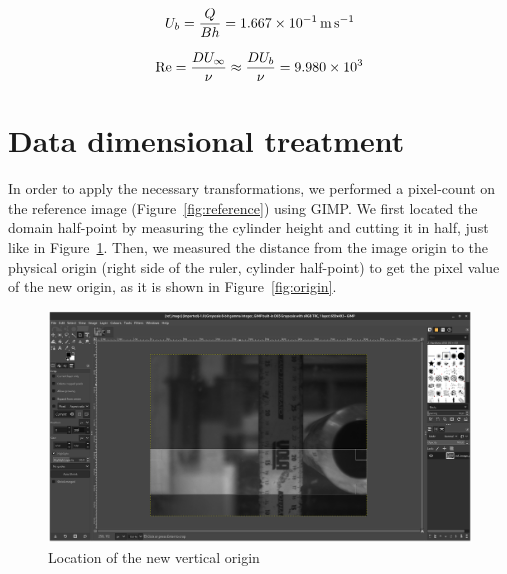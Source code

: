 \documentclass[12pt]{article}
\begin{document}
        \begin{equation} \label{eq:Ub}
                U_b = \frac{Q}{B h} = \SI{1.667E-1}{\metre \per \second}
        \end{equation}

        \begin{equation} \label{eq:Re}
                \text{Re} = \frac{D U_\infty}{\nu} \approx \frac{D U_b}{\nu} = \num{9.980E3}
        \end{equation}

\section{Data dimensional treatment} \label{sec:dimensional}

        In order to apply the necessary transformations, we performed a pixel-count on the reference image (Figure~\ref{fig:reference}) using GIMP. We first located the domain half-point by measuring the cylinder height and cutting it in half, just like in Figure~\ref{fig:half_point}. Then, we measured the distance from the image origin to the physical origin (right side of the ruler, cylinder half-point) to get the pixel value of the new origin, as it is shown in Figure~\ref{fig:origin}.

        \begin{figure}[ht!]
                \centering
                \includegraphics[width=\textwidth]{Half_Point_Finder.png}
                \caption{Location of the new vertical origin}
                \label{fig:half_point}
        \end{figure}
\end{document}
